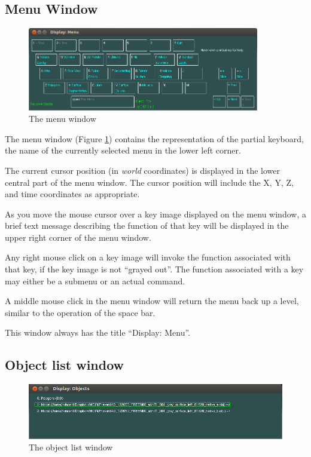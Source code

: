 \documentclass[11pt,letterpaper]{article}
\begin{document}
\subsection{Menu Window}

\begin{figure}
\centering
\includegraphics[width=0.9\textwidth]{display-top-menu.png}
\caption{The menu window}
\label{winMenu}
\end{figure}

The menu window (Figure \ref{winMenu}) contains the representation of
the partial keyboard, the name of the currently selected menu in the
lower left corner.

The current cursor position (in {\em world} coordinates) is displayed
in the lower central part of the menu window. The cursor position will
include the X, Y, Z, and time coordinates as appropriate.

As you move the mouse cursor over a key image displayed on the menu
window, a brief text message describing the function of that key will
be displayed in the upper right corner of the menu window.

Any right mouse click on a key image will invoke the function
associated with that key, if the key image is not ``grayed out''. The
function associated with a key may either be a submenu or an actual
command.

A middle mouse click in the menu window will return the menu back up a
level, similar to the operation of the space bar.

This window always has the title ``Display: Menu''.

\subsection{Object list window}

\begin{figure}
\centering
\includegraphics[width=0.9\linewidth]{display-obj-list.png}
\caption{The object list window}
\label{winObjList}
\end{figure}
\end{document}
